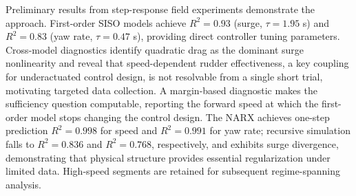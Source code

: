 \documentclass[12pt]{article}
\begin{document}
Preliminary results from step-response field experiments demonstrate the approach.
First-order SISO models achieve $R^2=0.93$ (surge, $\tau=1.95$ s) and $R^2=0.83$
(yaw rate, $\tau=0.47$ s), providing direct controller tuning parameters.
Cross-model diagnostics identify quadratic drag as the dominant surge nonlinearity
and reveal that speed-dependent rudder effectiveness, a key coupling for
underactuated control design, is not resolvable from a single short trial,
motivating targeted data collection. A margin-based diagnostic makes the
sufficiency question computable, reporting the forward speed at which the
first-order model stops changing the control design. The NARX achieves one-step
prediction $R^2=0.998$ for speed and $R^2=0.991$ for yaw rate; recursive simulation
falls to $R^2=0.836$ and $R^2=0.768$, respectively, and exhibits surge divergence,
demonstrating that physical structure provides essential regularization under
limited data. High-speed segments are retained for subsequent regime-spanning
analysis.
\end{document}

